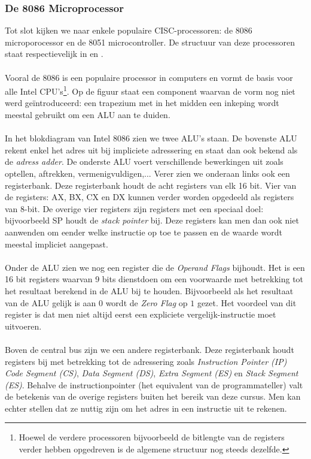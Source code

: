 \subsubsection{De 8086 Microprocessor}
Tot slot kijken we naar enkele populaire CISC-processoren: de 8086 microporocessor en de 8051 microcontroller. De structuur van deze processoren staat respectievelijk in  en .
\paragraph{}
Vooral de 8086 is een populaire processor in computers en vormt de basis voor alle Intel CPU's\footnote{Hoewel de verdere processoren bijvoorbeeld de bitlengte van de registers verder hebben opgedreven is de algemene structuur nog steeds dezelfde.}. Op de figuur staat een component waarvan de vorm nog niet werd ge\"introduceerd: een trapezium met in het midden een inkeping wordt meestal gebruikt om een ALU aan te duiden.
\paragraph{}
In het blokdiagram van Intel 8086 zien we twee ALU's staan. De bovenste ALU rekent enkel het adres uit bij impliciete adressering en staat dan ook bekend als de \emph{adress adder}. De onderste ALU voert verschillende bewerkingen uit zoals optellen, aftrekken, vermenigvuldigen,... Verer zien we onderaan links ook een registerbank. Deze registerbank houdt de acht registers van elk 16 bit. Vier van de registers: AX, BX, CX en DX kunnen verder worden opgedeeld als registers van 8-bit. De overige vier registers zijn registers met een speciaal doel: bijvoorbeeld SP houdt de \emph{stack pointer} bij. Deze registers kan men dan ook niet aanwenden om eender welke instructie op toe te passen en de waarde wordt meestal impliciet aangepast.
\paragraph{}
Onder de ALU zien we nog een register die de \emph{Operand Flags} bijhoudt. Het is een 16 bit registers waarvan 9 bits dienstdoen om een voorwaarde met betrekking tot het resultaat berekend in de ALU bij te houden. Bijvoorbeeld als het resultaat van de ALU gelijk is aan $0$ wordt de \emph{Zero Flag} op $1$ gezet. Het voordeel van dit register is dat men niet altijd eerst een expliciete vergelijk-instructie moet uitvoeren.
\paragraph{}
Boven de central bus zijn we een andere registerbank. Deze registerbank houdt registers bij met betrekking tot de adressering zoals \emph{Instruction Pointer (IP)} \emph{Code Segment (CS)}, \emph{Data Segment (DS)}, \emph{Extra Segment (ES)} en \emph{Stack Segment (ES)}. Behalve de instructionpointer (het equivalent van de programmateller) valt de betekenis van de overige registers buiten het bereik van deze cursus. Men kan echter stellen dat ze nuttig zijn om het adres in een instructie uit te rekenen.
